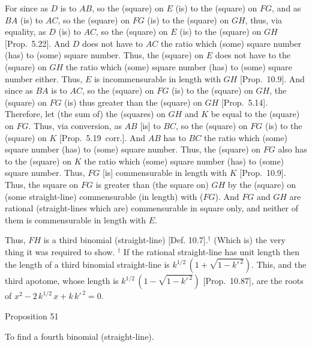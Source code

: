 For since as $D$ is to $AB$, so the (square) on $E$ (is) to the (square)
on $FG$, and as $BA$ (is) to $AC$, so the (square) on $FG$ (is) to
the (square) on $GH$, thus, via equality, as $D$ (is) to $AC$, so the
(square) on $E$ (is) to the (square) on $GH$ [Prop.~5.22]. And $D$ does not have to $AC$ the
ratio which (some) square number (has) to (some) square number.
Thus, the (square) on $E$ does not have to the (square) on $GH$ the ratio
which (some) square number (has) to (some) square number either.
Thus, $E$ is incommensurable in length with $GH$ [Prop.~10.9].  And since as $BA$ is to $AC$,
so the (square) on $FG$ (is) to the (square) on $GH$, the (square) on 
$FG$ (is) thus greater than the (square) on $GH$ [Prop.~5.14]. Therefore, let (the sum of) the (squares)
on $GH$ and $K$
be equal to the (square) on $FG$. Thus, via
conversion, as $AB$ [is] to $BC$, so the (square) on $FG$ (is) to the
(square) on $K$ [Prop.~5.19~corr.]. And $AB$
has to $BC$ the ratio which (some) square number (has) to (some) square
number. Thus, the (square) on $FG$ also has to the (square) on $K$
the ratio which (some) square number (has) to (some) square number.
Thus,  $FG$ [is] commensurable in length with $K$ [Prop.~10.9]. Thus, the square on
$FG$ is greater than (the square on) $GH$ by the (square) on
(some straight-line) commensurable (in length) with ($FG$). And $FG$ and $GH$
are rational (straight-lines which are) commensurable in square only,
and neither of them is commensurable in length with $E$.

Thus, $FH$ is a third binomial (straight-line) [Def. 10.7].$^\dag$ (Which is) the very thing it
was required to show.
{\footnotesize\noindent$^\dag$ If the rational straight-line has unit length then the length of a third binomial straight-line
is  $k^{1/2}\,(1+\sqrt{1-k'^{\,2}})$. This, and the third apotome,
whose length is $k^{1/2}\,(1-\sqrt{1-k'^{\,2}})$ [Prop.~10.87],
are the roots of $x^2- 2\,k^{1/2}\,x+k\,k'^{\,2}=0$.}


\begin{center}
{\large Proposition 51}
\end{center}

To find a fourth binomial (straight-line).

\epsfysize=1.2in
\centerline{}

